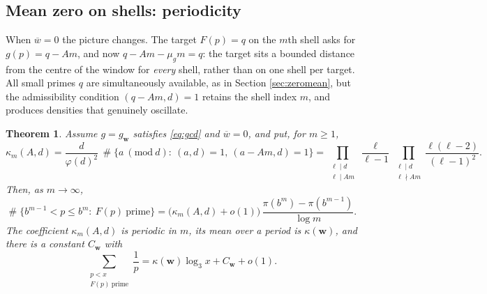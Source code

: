 \documentclass[11pt,reqno]{amsart}
\theoremstyle{plain}
\newtheorem{theorem}{Theorem}[section]
\theoremstyle{definition}
\DeclareMathOperator{\Card}{\#}
\begin{document}
\subsection{Mean zero on shells: periodicity}
When $\overline w=0$ the picture changes. The target $F(p)=q$ on the $m$th shell asks for $g(p)=q-Am$, and now $q-Am-\mu_gm=q$: the target sits a bounded distance from the centre of the window for \emph{every} shell, rather than on one shell per target. All small primes $q$ are simultaneously available, as in Section \ref{sec:zeromean}, but the admissibility condition $(q-Am,d)=1$ retains the shell index $m$, and produces densities that genuinely oscillate.

\begin{theorem}\label{thm:zeroweights}
Assume $g=g_{\mathbf w}$ satisfies \eqref{eq:gcd} and $\overline w=0$, and put, for $m\ge1$,
\begin{equation}\label{eq:kappam}
\kappa_m(A,d)=\frac{d}{\varphi(d)^{2}}\,
\Card\{a\ (\mathrm{mod}\ d):\ (a,d)=1,\ (a-Am,d)=1\}
=\prod_{\substack{\ell\mid d\\ \ell\mid Am}}\frac{\ell}{\ell-1}
\prod_{\substack{\ell\mid d\\ \ell\nmid Am}}\frac{\ell(\ell-2)}{(\ell-1)^{2}} .
\end{equation}
Then, as $m\to\infty$,
\begin{equation}\label{eq:zeroshell}
\Card\{b^{m-1}<p\le b^{m}:\ F(p)\ \text{prime}\}
=\big(\kappa_m(A,d)+o(1)\big)\,\frac{\pi(b^{m})-\pi(b^{m-1})}{\log m}.
\end{equation}
The coefficient $\kappa_m(A,d)$ is periodic in $m$, its mean over a period is $\kappa(\mathbf w)$, and there is a constant $C_{\mathbf w}$ with
\begin{equation}\label{eq:zeromertens}
\sum_{\substack{p<x\\ F(p)\ \text{prime}}}\frac1p=\kappa(\mathbf w)\log_3x+C_{\mathbf w}+o(1).
\end{equation}
\end{theorem}
\end{document}
